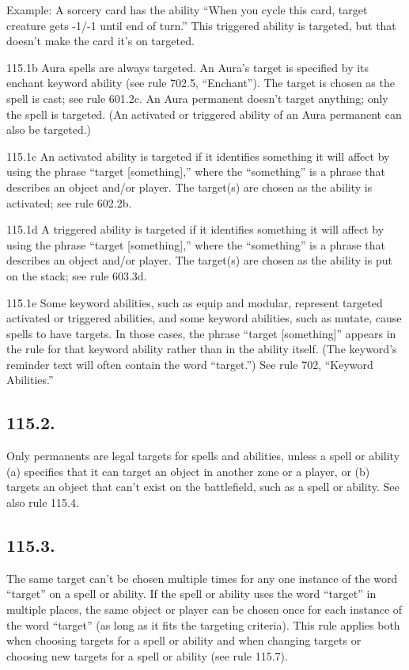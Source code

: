 Example: A sorcery card has the ability “When you cycle this card, target creature gets -1/-1 until end of turn.” This triggered ability is targeted, but that doesn’t make the card it’s on targeted.

115.1b Aura spells are always targeted. An Aura’s target is specified by its enchant keyword ability (see rule 702.5, “Enchant”). The target is chosen as the spell is cast; see rule 601.2c. An Aura permanent doesn’t target anything; only the spell is targeted. (An activated or triggered ability of an Aura permanent can also be targeted.)

115.1c An activated ability is targeted if it identifies something it will affect by using the phrase “target [something],” where the “something” is a phrase that describes an object and/or player. The target(s) are chosen as the ability is activated; see rule 602.2b.

115.1d A triggered ability is targeted if it identifies something it will affect by using the phrase “target [something],” where the “something” is a phrase that describes an object and/or player. The target(s) are chosen as the ability is put on the stack; see rule 603.3d.

115.1e Some keyword abilities, such as equip and modular, represent targeted activated or triggered abilities, and some keyword abilities, such as mutate, cause spells to have targets. In those cases, the phrase “target [something]” appears in the rule for that keyword ability rather than in the ability itself. (The keyword’s reminder text will often contain the word “target.”) See rule 702, “Keyword Abilities.”

\subsection*{115.2.}
Only permanents are legal targets for spells and abilities, unless a spell or ability (a) specifies that it can target an object in another zone or a player, or (b) targets an object that can’t exist on the battlefield, such as a spell or ability. See also rule 115.4.

\subsection*{115.3.}
The same target can’t be chosen multiple times for any one instance of the word “target” on a spell or ability. If the spell or ability uses the word “target” in multiple places, the same object or player can be chosen once for each instance of the word “target” (as long as it fits the targeting criteria). This rule applies both when choosing targets for a spell or ability and when changing targets or choosing new targets for a spell or ability (see rule 115.7).

